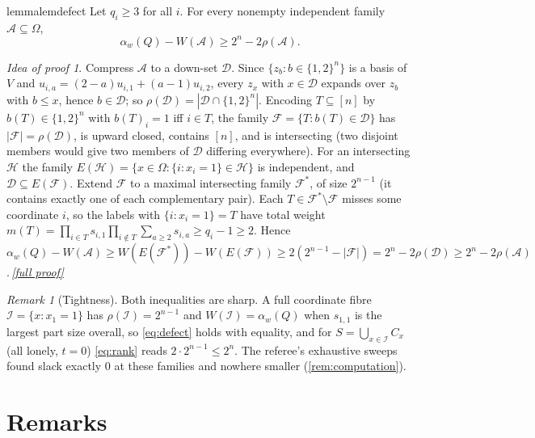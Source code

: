 \documentclass[11pt,a4paper]{article}
\theoremstyle{plain}
\theoremstyle{definition}
\theoremstyle{remark}
\newtheorem{remark}[theorem]{Remark}
\newtheorem*{proofidea}{Idea of proof}
\newcommand{\fullproofref}[1]{\,\hyperref[#1]{\textit{[full proof]}}}
\newcommand{\cA}{\mathcal A}
\newcommand{\cD}{\mathcal D}
\newcommand{\cF}{\mathcal F}
\newcommand{\cH}{\mathcal H}
\newcommand{\cI}{\mathcal I}
\newcommand{\Om}{\Omega}
\newcommand{\rk}{\rho}
\newcommand{\alw}{\alpha_w}
\begin{document}
\begin{restatable}{lemma}{lemdefect}\label{lem:defect}
Let $q_i\ge3$ for all $i$. For every nonempty independent family $\cA\subseteq\Om$,
\begin{equation}\label{eq:defect}
\alw(Q)-W(\cA)\ge2^n-2\rk(\cA).
\end{equation}
\end{restatable}
\begin{proofidea}
Compress $\cA$ to a down-set $\cD$. Since $\{z_b:b\in\{1,2\}^n\}$ is a basis of $V$ and $u_{i,a}=(2-a)u_{i,1}+(a-1)u_{i,2}$, every $z_x$ with $x\in\cD$ expands over $z_b$ with $b\le x$, hence $b\in\cD$; so $\rk(\cD)=|\cD\cap\{1,2\}^n|$. Encoding $T\subseteq[n]$ by $b(T)\in\{1,2\}^n$ with $b(T)_i=1$ iff $i\in T$, the family $\cF=\{T:b(T)\in\cD\}$ has $|\cF|=\rk(\cD)$, is upward closed, contains $[n]$, and is intersecting (two disjoint members would give two members of $\cD$ differing everywhere). For an intersecting $\cH$ the family $E(\cH)=\{x\in\Om:\{i:x_i=1\}\in\cH\}$ is independent, and $\cD\subseteq E(\cF)$. Extend $\cF$ to a maximal intersecting family $\cF^*$, of size $2^{n-1}$ (it contains exactly one of each complementary pair). Each $T\in\cF^*\setminus\cF$ misses some coordinate $i$, so the labels with $\{i:x_i=1\}=T$ have total weight $m(T)=\prod_{i\in T}s_{i,1}\prod_{i\notin T}\sum_{a\ge2}s_{i,a}\ge q_i-1\ge2$. Hence $\alw(Q)-W(\cA)\ge W(E(\cF^*))-W(E(\cF))\ge2(2^{n-1}-|\cF|)=2^n-2\rk(\cD)\ge2^n-2\rk(\cA)$.\fullproofref{pf:defect}
\end{proofidea}

\begin{remark}[Tightness]\label{rem:tight}
Both inequalities are sharp. A full coordinate fibre $\cI=\{x:x_1=1\}$ has $\rk(\cI)=2^{n-1}$ and $W(\cI)=\alw(Q)$ when $s_{1,1}$ is the largest part size overall, so \eqref{eq:defect} holds with equality, and for $S=\bigcup_{x\in\cI}C_x$ (all lonely, $t=0$) \eqref{eq:rank} reads $2\cdot2^{n-1}\le2^n$. The referee's exhaustive sweeps found slack exactly $0$ at these families and nowhere smaller (\cref{rem:computation}).
\end{remark}

\section{Remarks}\label{sec:remarks}
\end{document}
